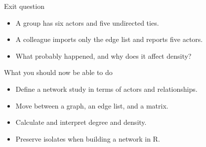 \documentclass[aspectratio=169,11pt]{beamer}
\begin{document}
\begin{frame}{Exit question}
\begin{itemize}
\item A group has six actors and five undirected ties.
\medskip
\item A colleague imports only the edge list and reports five actors.
\medskip
\item What probably happened, and why does it affect density?
\medskip
\end{itemize}

\end{frame}

\begin{frame}{What you should now be able to do}
\begin{itemize}
\item Define a network study in terms of actors and relationships.
\medskip
\item Move between a graph, an edge list, and a matrix.
\medskip
\item Calculate and interpret degree and density.
\medskip
\item Preserve isolates when building a network in R.
\medskip
\end{itemize}

\end{frame}
\end{document}
